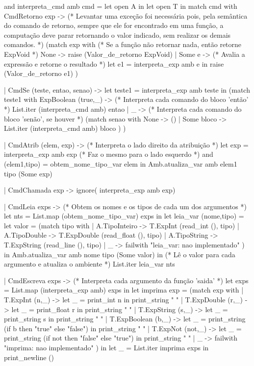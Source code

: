 \documentclass[12pt,a4paper,twoside]{report}
\begin{document}
\begin{terminal}
and interpreta_cmd amb cmd =
  let open A in
  let open T in
  match cmd with
    CmdRetorno exp ->
    (* Levantar uma exceção foi necessária pois, pela semântica do comando de
        retorno, sempre que ele for encontrado em uma função, a computação
        deve parar retornando o valor indicado, sem realizar os demais comandos.
    *)
    (match exp with
     (* Se a função não retornar nada, então retorne ExpVoid *)
       None -> raise (Valor_de_retorno ExpVoid)
     | Some e ->
       (* Avalia a expressão e retorne o resultado *)
       let e1 = interpreta_exp amb e in
       raise (Valor_de_retorno e1)
    )

  | CmdSe (teste, entao, senao) ->
    let teste1 = interpreta_exp amb teste in
    (match teste1 with
       ExpBoolean (true,_) ->
       (* Interpreta cada comando do bloco 'então' *)
       List.iter (interpreta_cmd amb) entao
     | _ ->
       (* Interpreta cada comando do bloco 'senão', se houver *)
       (match senao with
          None -> ()
        | Some bloco -> List.iter (interpreta_cmd amb) bloco
       )
    )

  | CmdAtrib (elem, exp) ->
    (* Interpreta o lado direito da atribuição *)
    let exp = interpreta_exp amb exp
    (* Faz o mesmo para o lado esquerdo *)
    and (elem1,tipo) = obtem_nome_tipo_var elem in
    Amb.atualiza_var amb elem1 tipo (Some exp)

  | CmdChamada exp -> ignore( interpreta_exp amb exp)

  | CmdLeia exps ->
    (* Obtem os nomes e os tipos de cada um dos argumentos *)
    let nts = List.map (obtem_nome_tipo_var) exps in
    let leia_var (nome,tipo) =
      let valor =
        (match tipo with
         | A.TipoInteiro    -> T.ExpInt    (read_int (),  tipo)
	 | A.TipoDouble    -> T.ExpDouble    (read_float (),  tipo)
         | A.TipoString -> T.ExpString (read_line (), tipo)
         | _ -> failwith "leia_var: nao implementado"
        )
      in  Amb.atualiza_var amb nome tipo (Some valor)
    in
    (* Lê o valor para cada argumento e atualiza o ambiente *)
    List.iter leia_var nts


  | CmdEscreva exps ->
    (* Interpreta cada argumento da função 'saida' *)
    let exps = List.map (interpreta_exp amb) exps in
    let imprima exp =
      (match exp with
       | T.ExpInt (n,_) ->      let _ = print_int n in print_string " "
       | T.ExpDouble (r,_) ->      let _ = print_float r in print_string " "
       | T.ExpString (s,_) -> let _ = print_string s in print_string " "
       | T.ExpBoolean (b,_) ->
         let _ = print_string (if b then "true" else "false")
         in print_string " "
        | T.ExpNot (not,_) ->
         let _ = print_string (if not then "false" else "true")
         in print_string " "
          | _ -> failwith "imprima: nao implementado"
      )
    in
    let _ = List.iter imprima exps in
    print_newline ()


\end{terminal}
\end{document}
